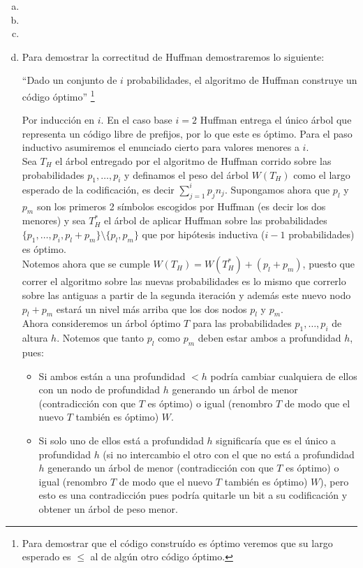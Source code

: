 \documentclass[dcc,uchile]{fcfmcourse}
\begin{document}
\begin{enumerate}[a)]
    \item
    \item
    \item 
    \item Para demostrar la correctitud de Huffman demostraremos lo siguiente:
    \begin{center}
    ``Dado un conjunto de $i$ probabilidades, el algoritmo de Huffman construye un código óptimo'' \footnote{Para demostrar que el código construído es óptimo veremos que su largo esperado es $\le$ al de algún otro código óptimo.}
    \end{center}
    Por inducción en $i$. En el caso base $i=2$ Huffman entrega el único árbol que representa un código libre de prefijos, por lo que este es óptimo. Para el paso inductivo asumiremos el enunciado cierto para valores menores a $i$.\\
    Sea $T_{H}$ el árbol entregado por el algoritmo de Huffman corrido sobre las probabilidades $p_{1},\ldots,p_{i}$ y definamos el peso del árbol $W(T_{H})$ como el largo esperado de la codificación, es decir $\sum_{j=1}^i p_{j}n_{j}$. Supongamos ahora que $p_{l}$ y $p_{m}$ son los primeros 2 símbolos escogidos por Huffman (es decir los dos menores) y sea $T_{H}^*$ el árbol de aplicar Huffman sobre las probabilidades $\{p_{1},\ldots,p_{i}, p_{l}+p_{m}\}\setminus\{p_{l}, p_{m}\}$ que por hipótesis inductiva ($i-1$ probabilidades) es óptimo.\\
    
    Notemos ahora que se cumple $W(T_{H}) = W(T_{H}^*) + (p_{l}+p_{m})$, puesto que correr el algoritmo sobre las nuevas probabilidades es lo mismo que correrlo sobre las antiguas a partir de la segunda iteración y además este nuevo nodo $p_{l}+p_{m}$ estará un nivel más arriba que los dos nodos $p_{l}$ y $p_{m}$.\\
    
    Ahora consideremos un árbol óptimo $T$ para las probabilidades  $p_{1},\ldots,p_{i}$ de altura $h$. Notemos que tanto $p_{l}$ como $p_{m}$ deben estar ambos a profundidad $h$, pues:
    \begin{itemize}
        \item Si ambos están a una profundidad $<h$ podría cambiar cualquiera de ellos con un nodo de profundidad $h$ generando un árbol de menor (contradicción con que $T$ es óptimo) o igual (renombro $T$ de modo que el nuevo $T$ también es óptimo) $W$.
        \item Si solo uno de ellos está a profundidad $h$ significaría que es el único a profundidad $h$ (si no intercambio el otro con el que no está a profundidad $h$ generando un árbol de menor (contradicción con que $T$ es óptimo) o igual (renombro $T$ de modo que el nuevo $T$ también es óptimo) $W$), pero esto es una contradicción pues podría quitarle un bit a su codificación y obtener un árbol de peso menor.
    \end{itemize}
    

\end{enumerate}
\end{document}
